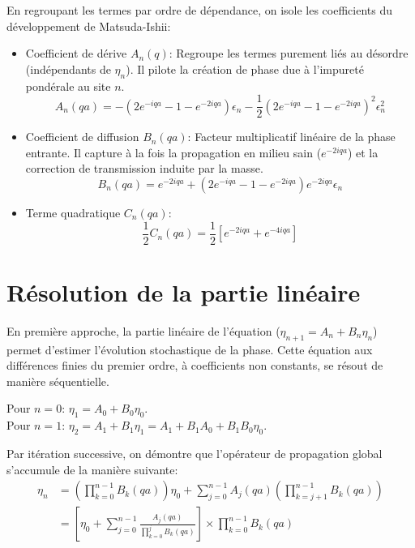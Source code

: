 En regroupant les termes par ordre de dépendance, on isole les coefficients du développement de Matsuda-Ishii:
\begin{itemize}
    \item Coefficient de dérive $A_n(q)$: Regroupe les termes purement liés au désordre (indépendants de $\eta_n$). Il pilote la création de phase due à l'impureté pondérale au site $n$.
    \begin{equation}
        A_n(qa) = - (2e^{-iqa} - 1 - e^{-2iqa})\epsilon_n - \frac{1}{2}{\left(2e^{-iqa} - 1 - e^{-2iqa}\right)}^2 \epsilon_n^2
    \end{equation}
    \item Coefficient de diffusion $B_n(qa)$: Facteur multiplicatif linéaire de la phase entrante. Il capture à la fois la propagation en milieu sain ($e^{-2iqa}$) et la correction de transmission induite par la masse.
    \begin{equation}
        B_n(qa) = e^{-2iqa} + (2e^{-iqa} - 1 - e^{-2iqa})e^{-2iqa}\epsilon_n
    \end{equation}
    \item Terme quadratique $C_n(qa)$:
    \begin{equation}
        \frac{1}{2} C_n(qa) = \frac{1}{2} [e^{-2iqa} + e^{-4iqa}]
    \end{equation}
\end{itemize}

\section{Résolution de la partie linéaire}
En première approche, la partie linéaire de l'équation ($\eta_{n+1} = A_n + B_n \eta_n$) permet d'estimer l'évolution stochastique de la phase. Cette équation aux différences finies du premier ordre, à coefficients non constants, se résout de manière séquentielle.

Pour $n=0$: $\eta_1 = A_0 + B_0 \eta_0$. \\
Pour $n=1$: $\eta_2 = A_1 + B_1 \eta_1 = A_1 + B_1 A_0 + B_1 B_0 \eta_0$.

Par itération successive, on démontre que l'opérateur de propagation global s'accumule de la manière suivante:
\begin{align}
    \eta_n &= \left( \prod_{k=0}^{n-1} B_k(qa) \right) \eta_0 + \sum_{j=0}^{n-1} A_j(qa) \left( \prod_{k=j+1}^{n-1} B_k(qa) \right) \\
    &= \left[ \eta_0 + \sum_{j=0}^{n-1} \frac{A_j(qa)}{\prod_{k=0}^{j} B_k(qa)} \right] \times \prod_{k=0}^{n-1} B_k(qa)
\end{align}

